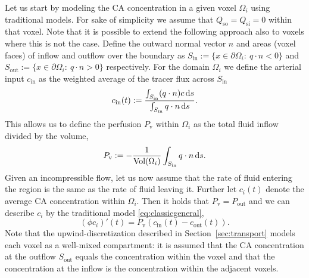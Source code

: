 \documentclass[journal,twocolumn]{IEEEtran}
\newcommand{\Perfv}{P_{\mathrm{v}}}
\begin{document}
	Let us start by modeling the CA concentration in a given voxel $\Omega_i$ using traditional models.
	For sake of simplicity we assume that $Q_{\mathrm{so}} = Q_{\mathrm{si}} = 0$ within that voxel.
	Note that it is possible to extend the following approach also to voxels where this is not the case.
	Define the outward normal vector $n$ and areas (voxel faces) of inflow and outflow over the boundary as $S_{\mathrm{in}} := \{ x \in \partial \Omega_i: \ q \cdot n < 0 \}$ and $S_{\mathrm{out}}:= \{ x \in \partial \Omega_i: \ q \cdot n > 0 \}$ respectively.
	For the domain $\Omega_i$ we define the arterial input $c_{\mathrm{in}}$ as the weighted average of the tracer flux across $S_{\mathrm{in}}$
	\begin{equation}\label{eq:cin}
	 	c_{\mathrm{in}}(t):= \frac{\int_{S_{\mathrm{in}}}(q \cdot n)c \diffint s}{\int_{S_{\mathrm{in}}} q \cdot n \diffint s}.
	\end{equation}
	This allows us to define the perfusion $\Perfv$ within $\Omega_i$ as the total fluid inflow divided by the volume,
	\begin{equation}\label{eq:perflocal}
		\Perfv :=-\frac{1}{\mathrm{Vol}( \Omega_i)}\int_{S_{\mathrm{in}}} q \cdot n \diffint s.
	\end{equation}
	Given an incompressible flow, let us now assume that the rate of fluid entering the region is the same as the rate of fluid leaving it. 
	Further let $c_i(t)$ denote the average CA concentration within $\Omega_i$.
	Then it holds that $\Perfv=P_{\mathrm{out}}$ and we can describe $c_i$ by the traditional model \eqref{eq:classicgeneral},
	\begin{equation}\label{eq:singlevoxel}
		(\phi c_i)'(t)  = \Perfv (c_\mathrm{in}(t)  - c_\mathrm{out}(t)).
	\end{equation}
	Note that the upwind-discretization described in Section~\ref{sec:transport} models each voxel as a well-mixed compartment: it is assumed that the CA concentration at the outflow $S_\mathrm{out}$ equals the concentration within the voxel and that the concentration at the inflow is the concentration within the adjacent voxels.
	
	
\end{document}
